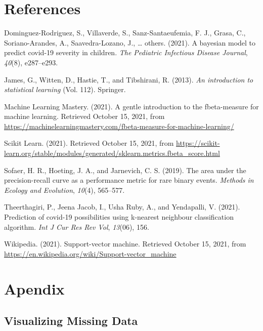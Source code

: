 \documentclass[
  10pt,
]{article}
\begin{document}
\hypertarget{references}{%
\section*{References}\label{references}}

\hypertarget{refs}{}
\leavevmode\hypertarget{ref-dominguez2021bayesian}{}%
Dominguez-Rodriguez, S., Villaverde, S., Sanz-Santaeufemia, F. J., Grasa, C., Soriano-Arandes, A., Saavedra-Lozano, J., \ldots{} others. (2021). A bayesian model to predict covid-19 severity in children. \emph{The Pediatric Infectious Disease Journal}, \emph{40}(8), e287--e293.

\leavevmode\hypertarget{ref-james2013introduction}{}%
James, G., Witten, D., Hastie, T., and Tibshirani, R. (2013). \emph{An introduction to statistical learning} (Vol. 112). Springer.

\leavevmode\hypertarget{ref-MLM}{}%
Machine Learning Mastery. (2021). A gentle introduction to the fbeta-measure for machine learning. Retrieved October 15, 2021, from \url{https://machinelearningmastery.com/fbeta-measure-for-machine-learning/}

\leavevmode\hypertarget{ref-scikit_learn}{}%
Scikit Learn. (2021). Retrieved October 15, 2021, from \url{https://scikit-learn.org/stable/modules/generated/sklearn.metrics.fbeta_score.html}

\leavevmode\hypertarget{ref-sofaer2019area}{}%
Sofaer, H. R., Hoeting, J. A., and Jarnevich, C. S. (2019). The area under the precision-recall curve as a performance metric for rare binary events. \emph{Methods in Ecology and Evolution}, \emph{10}(4), 565--577.

\leavevmode\hypertarget{ref-theerthagiri2021prediction}{}%
Theerthagiri, P., Jeena Jacob, I., Usha Ruby, A., and Yendapalli, V. (2021). Prediction of covid-19 possibilities using k-nearest neighbour classification algorithm. \emph{Int J Cur Res Rev\textbar{} Vol}, \emph{13}(06), 156.

\leavevmode\hypertarget{ref-wikipedia}{}%
Wikipedia. (2021). Support-vector machine. Retrieved October 15, 2021, from \url{https://en.wikipedia.org/wiki/Support-vector_machine}

\hypertarget{apendix}{%
\section*{Apendix}\label{apendix}}

\hypertarget{visualizing-missing-data}{%
\subsection{Visualizing Missing Data}\label{visualizing-missing-data}}
\end{document}
